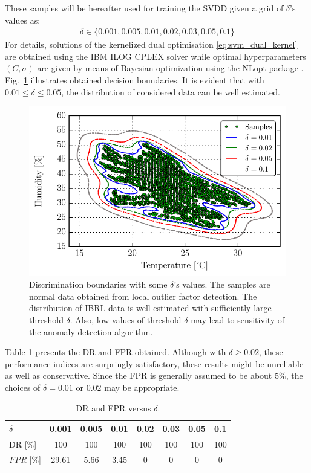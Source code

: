 \documentclass[conference]{IEEEtran}
\theoremstyle{problemstyle}
\begin{document}
These samples will be hereafter used for training the SVDD given a grid of $\delta$'s values as:
\begin{align}
\delta \in \{ 0.001, 0.005, 0.01, 0.02, 0.03, 0.05, 0.1 \}
\end{align}
For details, solutions of the kernelized dual optimisation \eqref{eq:svm_dual_kernel} are obtained using the IBM ILOG CPLEX solver while optimal hyperparameters $(C,\sigma)$ are given by means of Bayesian optimization using the NLopt package \cite{nlopt}. Fig.~\ref{fig:domain_boundary} illustrates obtained decision boundaries. It is evident that with $0.01 \le \delta \le 0.05$, the distribution of considered data can be well estimated. 
\begin{figure}[H]
\centering
\includegraphics[scale=.6]{Figs/data_description.pdf}
\caption{Discrimination boundaries with some $\delta$'s values. The samples are normal data obtained from local outlier factor detection. The distribution of IBRL data is well estimated with sufficiently large threshold $\delta$. Also, low values of threshold $\delta$ may lead to sensitivity of the anomaly detection algorithm.}
\label{fig:domain_boundary}
\end{figure}

Table 1 presents the DR and FPR obtained. Although with $\delta \ge 0.02$, these performance indices are surpringly satisfactory, these results might be unreliable as well as conservative. Since the FPR is generally assumed to be about $5 \%$, the choices of $\delta=0.01$ or $0.02$ may be appropriate. 
\begin{table}[H]
\begin{tabular}{lccccccc}
\toprule
$\delta$ & 0.001 & 0.005 & 0.01 & 0.02 & 0.03 & 0.05 & 0.1 \\\midrule[\lightrulewidth]
DR [\%] & 100 & 100 & 100 & 100 & 100 & 100 & 100 \\
\emph{FPR} [\%] & 29.61 & 5.66 & 3.45 & 0 & 0 & 0 &0 \\\bottomrule
\end{tabular}
\caption{DR and FPR versus $\delta$.}
\label{table:delta_eval}
\end{table}
\end{document}
